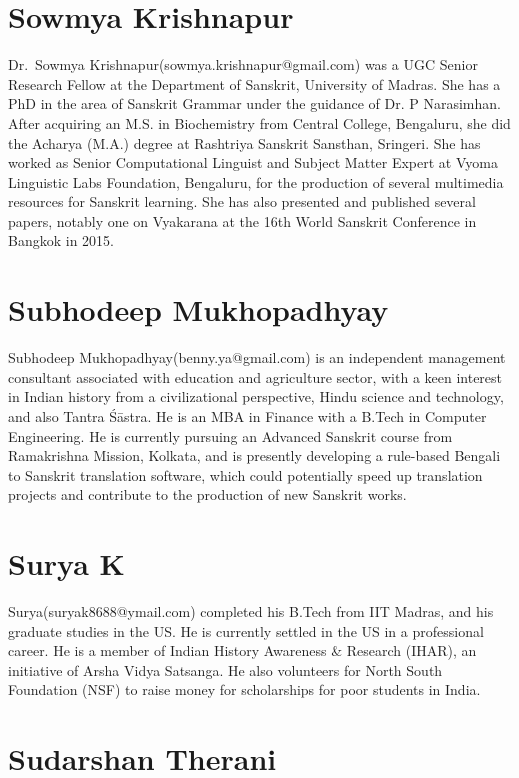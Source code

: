 \section*{Sowmya Krishnapur}

Dr.~Sowmya Krishnapur(sowmya.krishnapur@gmail.com) was a UGC Senior Research Fellow at the Department of Sanskrit, University of Madras. She has a PhD in the area of Sanskrit Grammar under the guidance of Dr. P Narasimhan. After acquiring an M.S. in Biochemistry from Central College, Bengaluru, she did the Acharya (M.A.) degree at Rashtriya Sanskrit Sansthan, Sringeri. She has worked as Senior Computational Linguist and Subject Matter Expert at Vyoma Linguistic Labs Foundation, Bengaluru, for the production of several multimedia resources for Sanskrit learning. She has also presented and published several papers, notably one on Vyakarana at the 16th World Sanskrit Conference in Bangkok in 2015.

\section*{Subhodeep Mukhopadhyay}

Subhodeep Mukhopadhyay(benny.ya@gmail.com) is an independent management consultant associated with education and agriculture sector, with a keen interest in Indian history from a civilizational perspective, Hindu science and technology, and also Tantra Śāstra. He is an MBA in Finance with a B.Tech in Computer Engineering. He is currently pursuing an Advanced Sanskrit course from Ramakrishna Mission, Kolkata, and is presently developing a rule-based Bengali to Sanskrit translation software, which could potentially speed up translation projects and contribute to the production of new Sanskrit works.

\section*{Surya K}

Surya(suryak8688@ymail.com) completed his B.Tech from IIT Madras, and his graduate studies in the US. He is currently settled in the US in a professional career. He is a member of Indian History Awareness \& Research (IHAR), an initiative of Arsha Vidya Satsanga. He also volunteers for North South Foundation (NSF) to raise money for scholarships for poor students in India. 

\section*{Sudarshan Therani}

